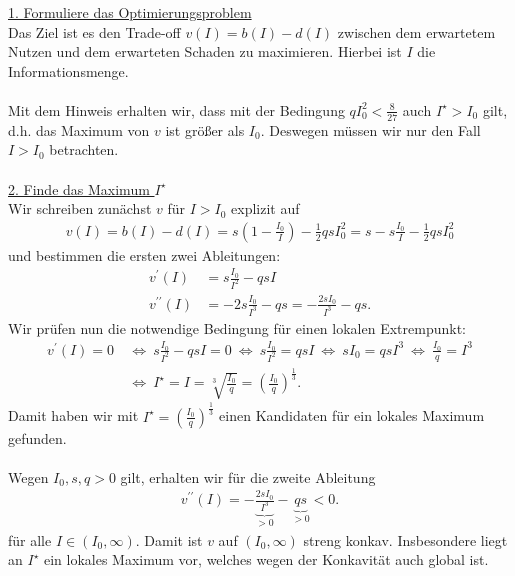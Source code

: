 \underline{1. Formuliere das Optimierungsproblem}\\
Das Ziel ist es den Trade-off $v(I) = b(I) - d(I)$ zwischen dem erwartetem Nutzen und dem erwarteten Schaden zu maximieren. Hierbei ist $I$ die Informationsmenge.\\
\\
Mit dem Hinweis erhalten wir, dass mit der Bedingung $q I_0^2  < \frac{8}{27}$ auch $I^\star > I_0$ gilt, d.h. das Maximum von $v$ ist größer als $I_0$. Deswegen müssen wir nur den Fall $I > I_0$ betrachten.\\
\\
\underline{2. Finde das Maximum $I^\star$}\\
Wir schreiben zunächst $v$ für $I > I_0$ explizit auf
\begin{align*}
	v(I)
	=
	b(I) - d(I) 
	=
	s \left(1 - \frac{I_0}{I}\right)
	- \frac{1}{2} q s I_0^2
	=
	s - s \frac{I_0}{I} - \frac{1}{2} q s I_0^2
\end{align*}
und bestimmen die ersten zwei Ableitungen:
\begin{align*}
	v^\prime(I) &= s \frac{I_0}{I^2} - q s I\\
	v^{\prime \prime}(I) &= -2s \frac{I_0}{I^3} - qs
	= - \frac{2s I_0}{I^3} - qs. 
\end{align*}
Wir prüfen nun die notwendige Bedingung für einen lokalen Extrempunkt:
\begin{align*}
	v^\prime(I) = 0 
	&\ \Leftrightarrow \
	s \frac{I_0}{I^2} - q s I = 0
	\ \Leftrightarrow \
	s \frac{I_0}{I^2} = qs I 
	\ \Leftrightarrow \
	s I_0 = qs I^3
	\ \Leftrightarrow \ 
	 \frac{I_0}{q} =  I^3 \\
	 &\ \Leftrightarrow \
	   I^\star = I  = \sqrt[3]{\frac{I_0}{q}} = \left( \frac{I_0}{q}\right)^{\frac{1}{3}}.
\end{align*}
Damit haben wir mit $I^\star = \left( \frac{I_0}{q}\right)^{\frac{1}{3}}$ einen Kandidaten für ein lokales Maximum gefunden.\\
\\
Wegen  $I_0, s , q > 0$ gilt, erhalten wir für die zweite Ableitung
\begin{align*}
	v^{\prime \prime}(I)
	= -\underbrace{ \frac{2s I_0}{I^3}}_{>0} - \underbrace{qs}_{>0} < 0.
\end{align*}
für alle $I \in (I_0, \infty)$. Damit ist $v$ auf $(I_0, \infty)$ streng konkav.
Insbesondere liegt an $I^\star $ ein lokales Maximum vor, welches wegen der Konkavität auch global ist.\\
\\
